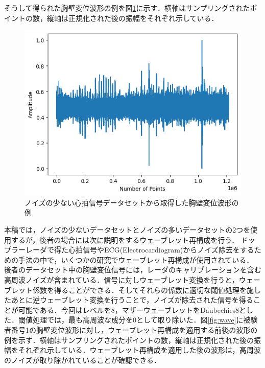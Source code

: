 そうして得られた胸壁変位波形の例を図\ref{fig:distance1}に示す．横軸はサンプリングされたポイントの数，縦軸は正規化された後の振幅をそれぞれ示している．

\begin{figure}[H]
\begin{center}
\includegraphics[width=\linewidth]{./fig/distance01.png}
\end{center}
\caption{ノイズの少ない心拍信号データセットから取得した胸壁変位波形の例}
\label{fig:distance1}
\end{figure}

本稿では，ノイズの少ないデータセットとノイズの多いデータセットの2つを使用するが，後者の場合には次に説明をするウェーブレット再構成を行う．
ドップラーレーダで得た心拍信号やECG(Electrocardiogram)からノイズ除去をするための手法の中で，いくつかの研究でウェーブレット再構成が使用されている\cite{paper:de-noise_technique, paper:dengue, paper:ecg_noise_removal}．
後者のデータセット中の胸壁変位信号には，レーダのキャリブレーションを含む高周波ノイズが含まれている．信号に対しウェーブレット変換を行うと，ウェーブレット係数を得ることができる．そしてそれらの係数に適切な閾値処理を施したあとに逆ウェーブレット変換を行うことで，ノイズが除去された信号を得ることが可能である．今回はレベルを8，マザーウェーブレットをDaubechies8とした．閾値処理では，最も高周波な成分を0として取り除いた．図\ref{fig:wave}に被験者番号1の胸壁変位波形に対し，ウェーブレット再構成を適用する前後の波形の例を示す．横軸はサンプリングされたポイントの数，縦軸は正規化された後の振幅をそれぞれ示している．ウェーブレット再構成を適用した後の波形は，高周波のノイズが取り除かれていることが確認できる．

